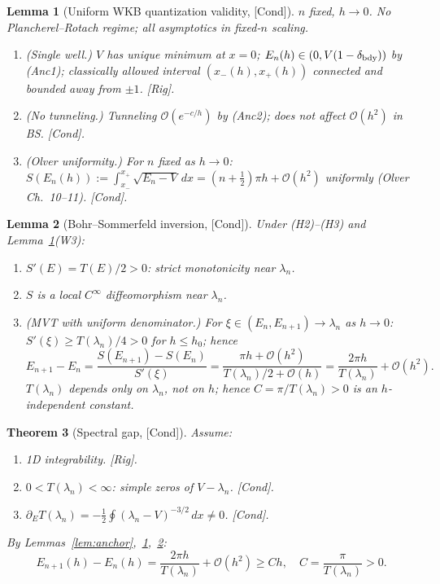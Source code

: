 \documentclass[12pt,a4paper]{amsart}
\newtheorem{theorem}{Theorem}[section]
\newtheorem{lemma}[theorem]{Lemma}
\theoremstyle{definition}
\theoremstyle{remark}
\newcommand{\Rig}{\textup{[Rig]}}
\newcommand{\Cond}{\textup{[Cond]}}
\begin{document}
\begin{lemma}[Uniform WKB quantization validity, \Cond]
\label{lem:wkb-validity}
$n$ fixed, $h\to 0$.
\emph{No Plancherel--Rotach regime; all asymptotics in fixed-$n$ scaling.}
\begin{enumerate}[{\rm(W1)}]
\item \textit{(Single well.)} $V$ has unique minimum at $x=0$;
  $E_n(h)\in(0,V(1-\delta_{\rm bdy}))$ by (Anc1);
  classically allowed interval $(x_-(h),x_+(h))$ connected
  and bounded away from $\pm 1$. \Rig.
\item \textit{(No tunneling.)} Tunneling $\mathcal{O}(e^{-c/h})$
  by (Anc2); does not affect $\mathcal{O}(h^2)$ in BS. \Cond.
\item \textit{(Olver uniformity.)} For $n$ fixed as $h\to 0$:
  $S(E_n(h)):=\int_{x_-}^{x_+}\sqrt{E_n-V}\,dx
  =(n+\tfrac12)\pi h+\mathcal{O}(h^2)$
  uniformly
  (Olver \cite{Olver1974} Ch.~10--11). \Cond.
\end{enumerate}
\end{lemma}

\begin{lemma}[Bohr--Sommerfeld inversion, \Cond]
\label{lem:bs-inversion}
Under (H2)--(H3) and Lemma~\ref{lem:wkb-validity}(W3):
\begin{enumerate}[{\rm(i)}]
\item $S'(E)=T(E)/2>0$: strict monotonicity near $\lambda_n$.
\item $S$ is a local $C^\infty$ diffeomorphism near $\lambda_n$.
\item \textit{(MVT with uniform denominator.)} For
  $\xi\in(E_n,E_{n+1})\to\lambda_n$ as $h\to 0$:
  $S'(\xi)\ge T(\lambda_n)/4>0$ for $h\le h_0$; hence
  \[
    E_{n+1}-E_n
    =\frac{S(E_{n+1})-S(E_n)}{S'(\xi)}
    =\frac{\pi h+\mathcal{O}(h^2)}{T(\lambda_n)/2+\mathcal{O}(h)}
    =\frac{2\pi h}{T(\lambda_n)}+\mathcal{O}(h^2).
  \]
  $T(\lambda_n)$ depends only on $\lambda_n$, not on $h$;
  hence $C=\pi/T(\lambda_n)>0$ is an $h$-independent constant.
\end{enumerate}
\end{lemma}

\begin{theorem}[Spectral gap, \Cond]
\label{thm:specgap}
Assume:
\begin{enumerate}[{\rm(H1)}]
\item 1D integrability. \Rig.
\item $0<T(\lambda_n)<\infty$: simple zeros of $V-\lambda_n$. \Cond.
\item $\partial_E T(\lambda_n)
  =-\tfrac12\oint(\lambda_n-V)^{-3/2}\,dx\ne 0$. \Cond.
\end{enumerate}
By Lemmas~\ref{lem:anchor},~\ref{lem:wkb-validity},~\ref{lem:bs-inversion}:
\begin{equation}\label{eq:specgap}
  E_{n+1}(h)-E_n(h)
  =\frac{2\pi h}{T(\lambda_n)}+\mathcal{O}(h^2)\ge Ch,
  \quad C=\frac{\pi}{T(\lambda_n)}>0.
\end{equation}
\end{theorem}
\end{document}
